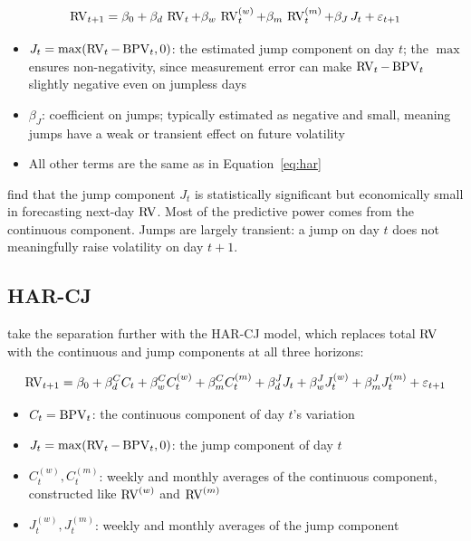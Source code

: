 \begin{equation}
  \operatorname{RV}_{t+1} = \beta_0 + \beta_d \, \operatorname{RV}_{t} + \beta_w \, \operatorname{RV}^{(w)}_{t} + \beta_m \, \operatorname{RV}^{(m)}_{t} + \beta_J \, J_t + \varepsilon_{t+1}
  \label{eq:har-j}
\end{equation}
\begin{itemize}[nosep]
  \item $J_t = \max(\operatorname{RV}_t - \operatorname{BPV}_t, 0)$: the estimated jump component on day $t$; the $\max$ ensures non-negativity, since measurement error can make $\operatorname{RV}_t - \operatorname{BPV}_t$ slightly negative even on jumpless days
  \item $\beta_J$: coefficient on jumps; typically estimated as negative and small, meaning jumps have a weak or transient effect on future volatility
  \item All other terms are the same as in Equation~\eqref{eq:har}
\end{itemize}

\begin{keyresult}
\citet{ABD2007} find that the jump component $J_t$ is statistically significant but economically small in forecasting next-day $\operatorname{RV}$.
Most of the predictive power comes from the continuous component.
Jumps are largely transient: a jump on day $t$ does not meaningfully raise volatility on day $t+1$.
\end{keyresult}

\subsection{HAR-CJ}

\citet{CorsiPirinoReno2010} take the separation further with the HAR-CJ model, which replaces total $\operatorname{RV}$ with the continuous and jump components at all three horizons:

\begin{equation}
  \operatorname{RV}_{t+1} = \beta_0 + \beta^C_d C_t + \beta^C_w C^{(w)}_t + \beta^C_m C^{(m)}_t
             + \beta^J_d J_t + \beta^J_w J^{(w)}_t + \beta^J_m J^{(m)}_t + \varepsilon_{t+1}
  \label{eq:har-cj}
\end{equation}
\begin{itemize}[nosep]
  \item $C_t = \operatorname{BPV}_t$: the continuous component of day $t$'s variation
  \item $J_t = \max(\operatorname{RV}_t - \operatorname{BPV}_t, 0)$: the jump component of day $t$
  \item $C^{(w)}_t, C^{(m)}_t$: weekly and monthly averages of the continuous component, constructed like $\operatorname{RV}^{(w)}$ and $\operatorname{RV}^{(m)}$
  \item $J^{(w)}_t, J^{(m)}_t$: weekly and monthly averages of the jump component
\end{itemize}

